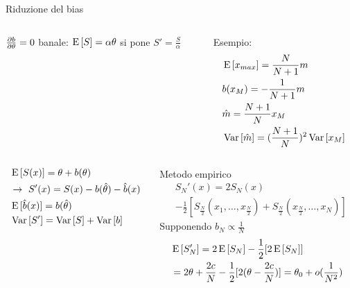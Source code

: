 \documentclass[asd-beamer.tex]{subfiles}
\begin{document}
\begin{frame}{Riduzione del bias}
	\begin{columns}[T]
		\begin{column}{0.5\textwidth}
			$\frac{\partial b}{\partial \theta}=0$ banale: $\operatorname{E}{[S]}=\alpha\theta$ si pone $S'=\frac{S}{\alpha}$
		\end{column}
		\begin{column}{0.5\textwidth}
			Esempio:
			\begin{align*}
			&\operatorname{E}{[x_{max}]}=\frac{N}{N+1}m\\
			&b(x_M)=-\frac{1}{N+1}m\\
			&\hat{m}=\frac{N+1}{N}x_M\\
			&\operatorname{Var}{[\hat{m}]}=(\frac{N+1}{N})^2\operatorname{Var}{[x_M]}
			\end{align*}
		\end{column}
	\end{columns}
	\begin{columns}[T]
		\begin{column}{0.5\textwidth}
			\begin{align*}
			&\operatorname{E}{[S(x)]}=\theta+b(\theta)\\
			&\to\ S'(x)=S(x)-b(\hat{\theta})-\hat{b}(x)\\
			&\operatorname{E}{[\hat{b}(x)]}=b(\hat{\theta})\\
			&\operatorname{Var}{[S']}=\operatorname{Var}{[S]}+\operatorname{Var}{[b]}
			\end{align*}
		\end{column}
		\begin{column}{0.5\textwidth}
			Metodo empirico
			\begin{align*}
			&S_N'(x)=2S_N(x)\\
			&-\frac{1}{2}[S_{\frac{N}{2}}(x_1,\ldots,x_{\frac{N}{2}})+S_{\frac{N}{2}}(x_{\frac{N}{2}},\ldots,x_N)]
			\end{align*}
			Supponendo $b_N\propto\frac{1}{N}$
			\begin{align*}
			&\operatorname{E}{[S_N']}=2\operatorname{E}{[S_N]}-\frac{1}{2}[2\operatorname{E}{[S_N]}]\\
			&=2\theta+\frac{2c}{N}-\frac{1}{2}[2(\theta-\frac{2c}{N})]=\theta_0+o(\frac{1}{N^2})
			\end{align*}
		\end{column}
	\end{columns}
	
\end{frame}
\end{document}
